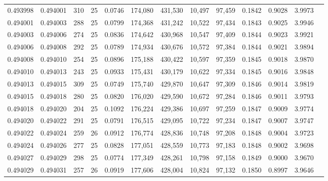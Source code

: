 \begin{tabular}{rrrrrrrrrrrrr}
0.493998 & 0.494001 &   310 &  25 &                                     0.0746 & 174,080 & 431,530 &  10,497 &  97,459 & 0.1842 & 0.9028 & 3.9973 \\
0.494001 & 0.494003 &   288 &  25 &                                     0.0799 & 174,368 & 431,242 &  10,522 &  97,434 & 0.1843 & 0.9025 & 3.9946 \\
0.494003 & 0.494006 &   274 &  25 &                                     0.0836 & 174,642 & 430,968 &  10,547 &  97,409 & 0.1844 & 0.9023 & 3.9921 \\
0.494006 & 0.494008 &   292 &  25 &                                     0.0789 & 174,934 & 430,676 &  10,572 &  97,384 & 0.1844 & 0.9021 & 3.9894 \\
0.494008 & 0.494010 &   254 &  25 &                                     0.0896 & 175,188 & 430,422 &  10,597 &  97,359 & 0.1845 & 0.9018 & 3.9870 \\
0.494010 & 0.494013 &   243 &  25 &                                     0.0933 & 175,431 & 430,179 &  10,622 &  97,334 & 0.1845 & 0.9016 & 3.9848 \\
0.494013 & 0.494015 &   309 &  25 &                                     0.0749 & 175,740 & 429,870 &  10,647 &  97,309 & 0.1846 & 0.9014 & 3.9819 \\
0.494015 & 0.494018 &   280 &  25 &                                     0.0820 & 176,020 & 429,590 &  10,672 &  97,284 & 0.1846 & 0.9011 & 3.9793 \\
0.494018 & 0.494020 &   204 &  25 &                                     0.1092 & 176,224 & 429,386 &  10,697 &  97,259 & 0.1847 & 0.9009 & 3.9774 \\
0.494020 & 0.494022 &   291 &  25 &                                     0.0791 & 176,515 & 429,095 &  10,722 &  97,234 & 0.1847 & 0.9007 & 3.9747 \\
0.494022 & 0.494024 &   259 &  26 &                                     0.0912 & 176,774 & 428,836 &  10,748 &  97,208 & 0.1848 & 0.9004 & 3.9723 \\
0.494024 & 0.494026 &   277 &  25 &                                     0.0828 & 177,051 & 428,559 &  10,773 &  97,183 & 0.1848 & 0.9002 & 3.9698 \\
0.494027 & 0.494029 &   298 &  25 &                                     0.0774 & 177,349 & 428,261 &  10,798 &  97,158 & 0.1849 & 0.9000 & 3.9670 \\
0.494029 & 0.494031 &   257 &  26 &                                     0.0919 & 177,606 & 428,004 &  10,824 &  97,132 & 0.1850 & 0.8997 & 3.9646 \\

\end{tabular}
